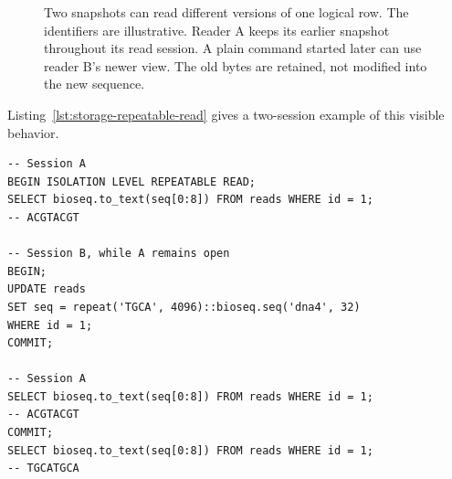 \begin{figure}[htbp]
\centering
{}
\caption{Two snapshots can read different versions of one logical row.
The identifiers are illustrative. Reader A keeps its earlier snapshot
throughout its read session. A plain command started later can use reader B's
newer view. The old bytes are retained, not modified into the new sequence.}
\label{fig:storage-update-snapshots}
\end{figure}

Listing~\ref{lst:storage-repeatable-read} gives a two-session example of
this visible behavior.

\begin{lstlisting}[style=bioseq-storage-sql,float=htbp,
  label={lst:storage-repeatable-read},
  caption={A repeatable-read transaction keeps the old sequence version.
    Initially, row id 1 begins with ACGTACGT.}]
-- Session A
BEGIN ISOLATION LEVEL REPEATABLE READ;
SELECT bioseq.to_text(seq[0:8]) FROM reads WHERE id = 1;
-- ACGTACGT

-- Session B, while A remains open
BEGIN;
UPDATE reads
SET seq = repeat('TGCA', 4096)::bioseq.seq('dna4', 32)
WHERE id = 1;
COMMIT;

-- Session A
SELECT bioseq.to_text(seq[0:8]) FROM reads WHERE id = 1;
-- ACGTACGT
COMMIT;
SELECT bioseq.to_text(seq[0:8]) FROM reads WHERE id = 1;
-- TGCATGCA
\end{lstlisting}

